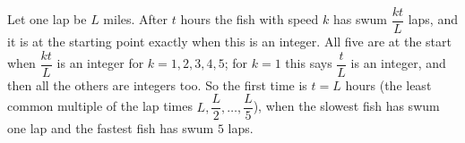 Let one lap be $L$ miles. After $t$ hours the fish with speed $k$ has swum $\dfrac{kt}{L}$ laps, and it is at the starting point exactly when this is an integer. All five are at the start when $\dfrac{kt}{L}$ is an integer for $k=1,2,3,4,5$; for $k=1$ this says $\dfrac tL$ is an integer, and then all the others are integers too. So the first time is $t=L$ hours (the least common multiple of the lap times $L,\dfrac L2,\dots,\dfrac L5$), when the slowest fish has swum one lap and the fastest fish has swum $\boxed{5}$ laps.
